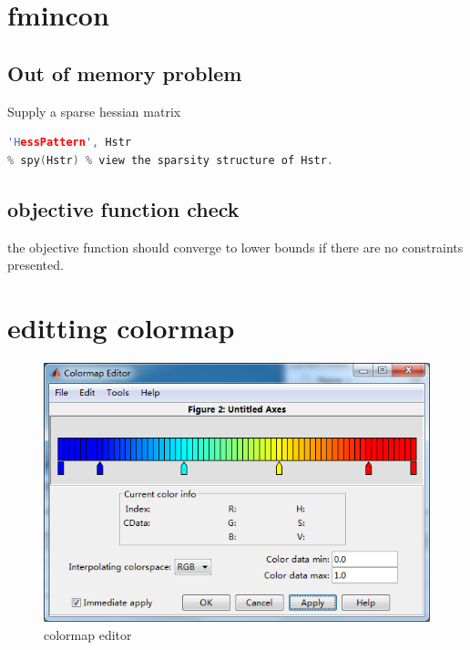 \documentclass[10pt,a4paper]{article}
\begin{document}
\section{fmincon}
\subsection{Out of memory problem}
Supply a sparse hessian matrix 
\begin{lstlisting}[language=c++]
'HessPattern', Hstr
% spy(Hstr) % view the sparsity structure of Hstr.
\end{lstlisting}
\subsection{objective function check}
the objective function should converge to lower bounds if there are no constraints presented.

\section{editting colormap}
\begin{figure}[h!]
\centering
\includegraphics[width=0.7\linewidth]{colormapEditor}
\caption{colormap editor}
\label{fig:colormapeditor}
\end{figure}


	
\end{document}
